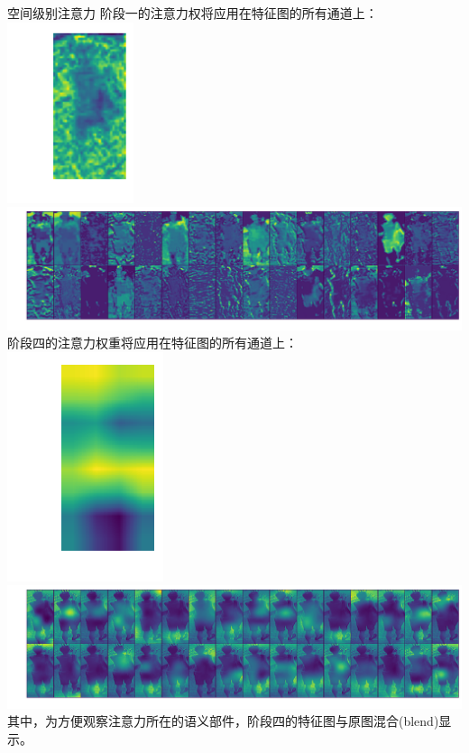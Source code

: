 \documentclass[usenames,dvipsnames,notes]{beamer}
\begin{document}
\begin{frame}{空间级别注意力}
	阶段一的注意力权将应用在特征图的所有通道上：\\
	\includegraphics[height=.15\textheight]{fig/spatial-high-mask.png} \includegraphics[height=.26\textheight]{fig/spatial-low.png} \\
	阶段四的注意力权重将应用在特征图的所有通道上：\\
	\includegraphics[height=.15\textheight]{fig/spatial-low-mask.png} \includegraphics[height=.26\textheight]{fig/spatial.png} \\
	其中，为方便观察注意力所在的语义部件，阶段四的特征图与原图混合(blend)显示。
\end{frame}
\end{document}

